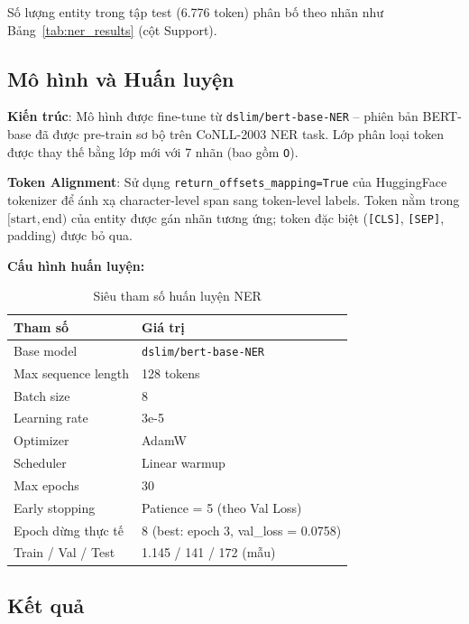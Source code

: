 Số lượng entity trong tập test (6.776 token) phân bố theo nhãn như Bảng~\ref{tab:ner_results} (cột Support).

\subsection{Mô hình và Huấn luyện}

\textbf{Kiến trúc}: Mô hình được fine-tune từ \texttt{dslim/bert-base-NER} -- phiên bản BERT-base đã được pre-train sơ bộ trên CoNLL-2003 NER task. Lớp phân loại token được thay thế bằng lớp mới với 7 nhãn (bao gồm \texttt{O}).

\textbf{Token Alignment}: Sử dụng \texttt{return\_offsets\_mapping=True} của HuggingFace tokenizer để ánh xạ character-level span sang token-level labels. Token nằm trong $[\text{start}, \text{end})$ của entity được gán nhãn tương ứng; token đặc biệt (\texttt{[CLS]}, \texttt{[SEP]}, padding) được bỏ qua.

\textbf{Cấu hình huấn luyện:}

\begin{table}[H]
    \centering
    \caption{Siêu tham số huấn luyện NER}
    \label{tab:ner_hyperparams}
    \begin{tabular}{|l|l|}
        \hline
        \textbf{Tham số} & \textbf{Giá trị} \\ \hline
        Base model          & \texttt{dslim/bert-base-NER} \\ \hline
        Max sequence length & 128 tokens \\ \hline
        Batch size          & 8 \\ \hline
        Learning rate       & 3e-5 \\ \hline
        Optimizer           & AdamW \\ \hline
        Scheduler           & Linear warmup \\ \hline
        Max epochs          & 30 \\ \hline
        Early stopping      & Patience = 5 (theo Val Loss) \\ \hline
        Epoch dừng thực tế  & 8 (best: epoch 3, val\_loss = 0.0758) \\ \hline
        Train / Val / Test  & 1.145 / 141 / 172 (mẫu) \\ \hline
    \end{tabular}
\end{table}

\subsection{Kết quả}

